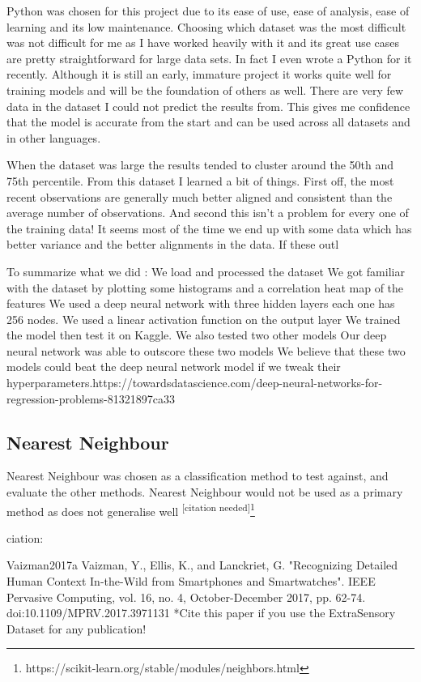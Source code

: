 \documentclass{UoNMCHA}
\newcommand{\citationneeded}{\textsuperscript{\color{blue} [citation needed]}}
\numberwithin{equation}{section}
\begin{document}
Python was chosen for this project due to its ease of use, ease of analysis, ease of learning and its low maintenance. Choosing which dataset was the most difficult was not difficult for me as I have worked heavily with it and its great use cases are pretty straightforward for large data sets. In fact I even wrote a Python for it recently. Although it is still an early, immature project it works quite well for training models and will be the foundation of others as well. There are very few data in the dataset I could not predict the results from. This gives me confidence that the model is accurate from the start and can be used across all datasets and in other languages.

When the dataset was large the results tended to cluster around the 50th and 75th percentile. From this dataset I learned a bit of things. First off, the most recent observations are generally much better aligned and consistent than the average number of observations. And second this isn't a problem for every one of the training data! It seems most of the time we end up with some data which has better variance and the better alignments in the data. If these outl





To summarize what we did :
We load and processed the dataset
We got familiar with the dataset by plotting some histograms and a correlation heat map of the features
We used a deep neural network with three hidden layers each one has 256 nodes.
We used a linear activation function on the output layer
We trained the model then test it on Kaggle.
We also tested two other models
Our deep neural network was able to outscore these two models
We believe that these two models could beat the deep neural network model if we tweak their hyperparameters.https://towardsdatascience.com/deep-neural-networks-for-regression-problems-81321897ca33


\subsection{Nearest Neighbour}
Nearest Neighbour was chosen as a classification method to test against, and evaluate the other methods. Nearest Neighbour would not be used as a primary method as does not generalise well\citationneeded \footnote{https://scikit-learn.org/stable/modules/neighbors.html}



ciation:

Vaizman2017a	
Vaizman, Y., Ellis, K., and Lanckriet, G. "Recognizing Detailed Human Context In-the-Wild from Smartphones and Smartwatches". IEEE Pervasive Computing, vol. 16, no. 4, October-December 2017, pp. 62-74. doi:10.1109/MPRV.2017.3971131
*Cite this paper if you use the ExtraSensory Dataset for any publication!
\end{document}
